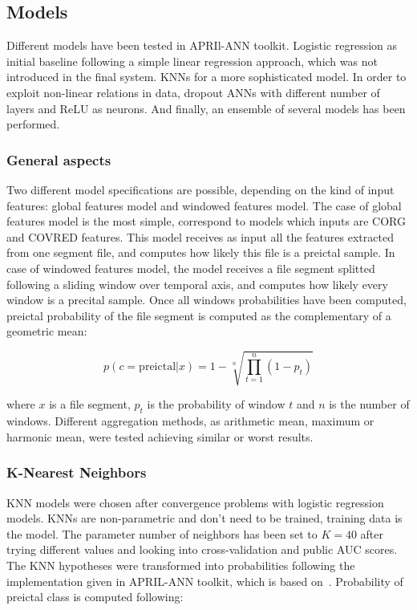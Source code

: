 \documentclass[a4paper,english,twoside]{article}
\begin{document}
\subsection{Models}\label{models}

Different models have been tested in APRIl-ANN toolkit. Logistic regression as
initial baseline following a simple linear regression approach, which was not
introduced in the final system. KNNs for a more sophisticated model. In order to
exploit non-linear relations in data, dropout ANNs with different number of
layers and ReLU as neurons. And finally, an ensemble of several models has been
performed.

\subsubsection{General aspects}

Two different model specifications are possible, depending on the kind of input
features: global features model and windowed features model. The case of global
features model is the most simple, correspond to models which inputs are CORG and
COVRED features. This model receives as input all the features extracted from
one segment file, and computes how likely this file is a preictal sample. In
case of windowed features model, the model receives a file segment splitted
following a sliding window over temporal axis, and computes how likely every
window is a precital sample. Once all windows probabilities have been computed,
preictal probability of the file segment is computed as the complementary of a
geometric mean:

\begin{equation}
p(c=\text{preictal} | x) = 1 - \sqrt[n]{\prod_{t=1}^n (1 - p_t)}
\label{eq:gmean}
\end{equation}

\noindent where $x$ is a file segment, $p_t$ is the probability of window $t$
and $n$ is the number of windows. Different aggregation methods, as arithmetic
mean, maximum or harmonic mean, were tested achieving similar or worst results.

\subsubsection{K-Nearest Neighbors}\label{k-nearest-neighbors}

KNN models were chosen after convergence problems with logistic regression
models. KNNs are non-parametric and don't need to be trained, training data is
the model. The parameter number of neighbors has been set to $K=40$ after trying
different values and looking into cross-validation and public AUC scores. The
KNN hypotheses were transformed into probabilities following the implementation
given in APRIL-ANN toolkit, which is based
on~\cite{2005:nips:hinton:NCA}. Probability of preictal class is computed
following:
\end{document}
